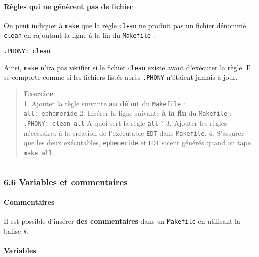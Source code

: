 \documentclass[11pt]{article}
\begin{document}
\paragraph{Règles qui ne génèrent pas de
fichier}\label{ruxe8gles-qui-ne-guxe9nuxe8rent-pas-de-fichier}

On peut indiquer à \texttt{make} que la règle \texttt{clean} ne produit
pas un fichier dénommé \texttt{clean} en rajoutant la ligne à la fin du
\texttt{Makefile} :

\begin{verbatim}
.PHONY: clean
\end{verbatim}

Ainsi, \texttt{make} n'ira pas vérifier si le fichier \texttt{clean}
existe avant d'exécuter la règle. Il se comporte comme si les fichiers
listés après \texttt{.PHONY} n'étaient jamais à jour.

    \begin{quote}
\textbf{Exercice}\\
1. Ajouter la règle suivante \textbf{au début} du \texttt{Makefile} :\\
\texttt{all:\ ephemeride} 2. Insérer la ligne suivante \textbf{à la fin}
du \texttt{Makefile} :\\
\texttt{.PHONY:\ clean\ all} A quoi sert la règle \texttt{all} ? 3.
Ajouter les règles nécessaires à la création de l'exécutable
\texttt{EDT} dans \texttt{Makefile}. 4. S'assurer que les deux
exécutables, \texttt{ephemeride} et \texttt{EDT} soient générés quand on
tape \texttt{make\ all}.
\end{quote}

    \begin{center}\rule{0.5\linewidth}{\linethickness}\end{center}

    \subsubsection{6.6 Variables et
commentaires}\label{variables-et-commentaires}

\paragraph{Commentaires}\label{commentaires}

Il est possible d'insérer \textbf{des commentaires} dans un
\texttt{Makefile} en utilisant la balise \texttt{\#}.

\paragraph{Variables}\label{variables}
\end{document}
